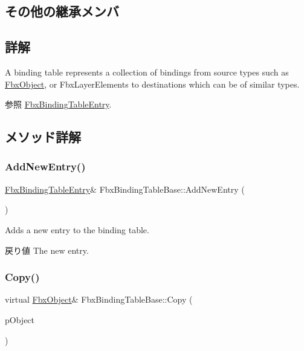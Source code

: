 \subsection*{その他の継承メンバ}


\subsection{詳解}
A binding table represents a collection of bindings from source types such as \hyperlink{class_fbx_object}{Fbx\+Object}, or Fbx\+Layer\+Elements to destinations which can be of similar types. \begin{DoxySeeAlso}{参照}
\hyperlink{class_fbx_binding_table_entry}{Fbx\+Binding\+Table\+Entry}. 
\end{DoxySeeAlso}


\subsection{メソッド詳解}
\mbox{\label{class_fbx_binding_table_base_a2ebf180e80538abf0e6512a8ca30ee10}} 
\subsubsection{\texorpdfstring{Add\+New\+Entry()}{AddNewEntry()}}
{\footnotesize\ttfamily \hyperlink{class_fbx_binding_table_entry}{Fbx\+Binding\+Table\+Entry}\& Fbx\+Binding\+Table\+Base\+::\+Add\+New\+Entry (\begin{DoxyParamCaption}{ }\end{DoxyParamCaption})}

Adds a new entry to the binding table. \begin{DoxyReturn}{戻り値}
The new entry. 
\end{DoxyReturn}
\mbox{\label{class_fbx_binding_table_base_a9181d090913b604fd10a0a660a6e823b}} 
\subsubsection{\texorpdfstring{Copy()}{Copy()}}
{\footnotesize\ttfamily virtual \hyperlink{class_fbx_object}{Fbx\+Object}\& Fbx\+Binding\+Table\+Base\+::\+Copy (\begin{DoxyParamCaption}\item[{const \hyperlink{class_fbx_object}{Fbx\+Object} \&}]{p\+Object }\end{DoxyParamCaption})\hspace{0.3cm}{\ttfamily [virtual]}}

